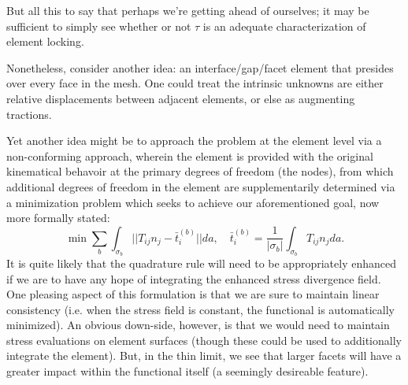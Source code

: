 \documentclass[11pt]{article} %
\begin{document}
But all this to say that perhaps we're getting ahead of ourselves; it may be sufficient to simply see whether or not $\tau$ is an adequate characterization of element locking.

Nonetheless, consider another idea: an interface/gap/facet element that presides over every face in the mesh. One could treat the intrinsic unknowns are either relative displacements between adjacent elements, or else as augmenting tractions.

Yet another idea might be to approach the problem at the element level via a non-conforming approach, wherein the element is provided with the original kinematical behavoir at the primary degrees of freedom (the nodes), from which additional degrees of freedom in the element are supplementarily determined via a minimization problem which seeks to achieve our aforementioned goal, now more formally stated:
\begin{equation}
	\min \sum_b \int_{\sigma_b} || T_{ij} n_j - \bar{t}^{(b)}_{i} || da, \quad \bar{t}^{(b)}_{i} = \frac{1}{| \sigma_b |} \int_{\sigma_b} T_{ij} n_j da.
\end{equation}
It is quite likely that the quadrature rule will need to be appropriately enhanced if we are to have any hope of integrating the enhanced stress divergence field. One pleasing aspect of this formulation is that we are sure to maintain linear consistency (i.e. when the stress field is constant, the functional is automatically minimized). An obvious down-side, however, is that we would need to maintain stress evaluations on element surfaces (though these could be used to additionally integrate the element). But, in the thin limit, we see that larger facets will have a greater impact within the functional itself (a seemingly desireable feature).
\end{document}
